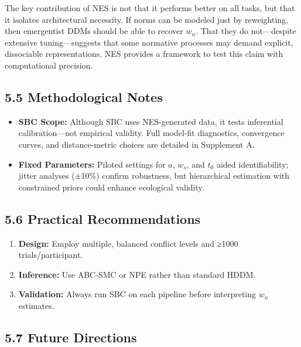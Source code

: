 \documentclass[
  11pt,
]{article}
\providecommand{\tightlist}{%
  \setlength{\itemsep}{0pt}\setlength{\parskip}{0pt}}
\begin{document}
The key contribution of NES is not that it performs better on all tasks,
but that it isolates architectural necessity. If norms can be modeled
just by reweighting, then emergentist DDMs should be able to recover
\(w_n\). That they do not---despite extensive tuning---suggests that
some normative processes may demand explicit, dissociable
representations. NES provides a framework to test this claim with
computational precision.

\subsection{5.5 Methodological Notes}\label{methodological-notes}

\begin{itemize}
\tightlist
\item
  \textbf{SBC Scope:} Although SBC uses NES-generated data, it tests
  inferential calibration---not empirical validity. Full model-fit
  diagnostics, convergence curves, and distance-metric choices are
  detailed in Supplement A.\\
\item
  \textbf{Fixed Parameters:} Piloted settings for \(a\), \(w_s\), and
  \(t_0\) aided identifiability; jitter analyses (±10\%) confirm
  robustness, but hierarchical estimation with constrained priors could
  enhance ecological validity.
\end{itemize}

\subsection{5.6 Practical
Recommendations}\label{practical-recommendations}

\begin{enumerate}
\def\labelenumi{\arabic{enumi}.}
\tightlist
\item
  \textbf{Design:} Employ multiple, balanced conflict levels and ≥1000
  trials/participant.\\
\item
  \textbf{Inference:} Use ABC-SMC or NPE rather than standard HDDM.\\
\item
  \textbf{Validation:} Always run SBC on each pipeline before
  interpreting \(w_n\) estimates.
\end{enumerate}

\subsection{5.7 Future Directions}\label{future-directions}
\end{document}
